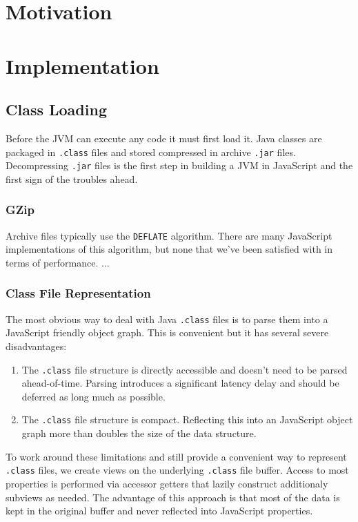 \documentclass{acm_proc_article-sp}
\begin{document}
\section{Motivation}



\section{Implementation}

\subsection{Class Loading}

Before the JVM can execute any code it must first load it.
Java classes are packaged in \texttt{.class} files and stored compressed in archive \texttt{.jar} files.
Decompressing \texttt{.jar} files is the first step in building a JVM in JavaScript and the first sign of the troubles ahead.

\subsubsection{GZip}

Archive files typically use the \texttt{DEFLATE} algorithm.
There are many JavaScript implementations of this algorithm, but none that we've been satisfied with in terms of performance.
...

\subsubsection{Class File Representation}

The most obvious way to deal with Java \texttt{.class} files is to parse them into a JavaScript friendly object graph.
This is convenient but it has several severe disadvantages:
\begin{enumerate}
\item The \texttt{.class} file structure is directly accessible and doesn't need to be parsed ahead-of-time.
Parsing introduces a significant latency delay and should be deferred as long much as possible. 
\item The \texttt{.class} file structure is compact. Reflecting this into an JavaScript object graph more than doubles the size of the data structure.
\end{enumerate}

To work around these limitations and still provide a convenient way to represent \texttt{.class} files, we create views on the underlying \texttt{.class} file buffer.
Access to most properties is performed via accessor getters that lazily construct additionaly subviews as needed.
The advantage of this approach is that most of the data is kept in the original buffer and never reflected into JavaScript properties.
\end{document}
